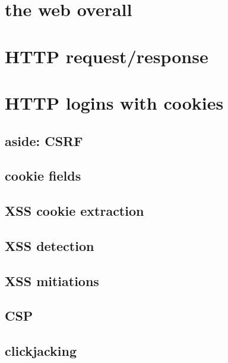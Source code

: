 
\usetikzlibrary{arrows.meta,calc,shapes.callouts,positioning}
\section{the web overall}


\section{HTTP request/response}


%
\section{HTTP logins with cookies}


\subsection{aside: CSRF}


\subsection{cookie fields}


\subsection{XSS cookie extraction}




\subsection{XSS detection}


\subsection{XSS mitiations}


\subsection{CSP}


\subsection{clickjacking}


